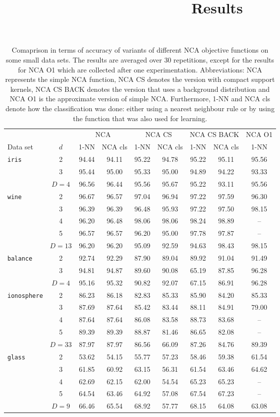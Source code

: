 \documentclass[a4paper,10pt]{article}
\title{Results}
\author{}
\date{}
\begin{document}
\begin{table}[!h]
\centering\begin{tabular}{lcccccccc}
\toprule
	 &     & \multicolumn{2}{c}{NCA}  & \multicolumn{2}{c}{NCA CS} & \multicolumn{2}{c}{NCA CS BACK} & NCA O1 \\
\cmidrule(r){3-4} \cmidrule(r){5-6} \cmidrule(r){7-8} \cmidrule(r){9-9}
Data set & $d$ & 1-NN & NCA cls & 1-NN & NCA cls & 1-NN & NCA cls & 1-NN\\
\midrule
\texttt{iris}	&2&94.44&94.11&95.22&94.78&95.22&95.11&95.56\\
				&3	&95.44&95.00&95.33&95.00&94.89&94.22&93.33\\
				&$D=4$	&96.56&96.44&95.56&95.67&95.22&93.11&95.56\\
\midrule
\texttt{wine}	&2
				&96.67&96.57&97.04&96.94&97.22&97.59&96.30\\
			&3	&96.39&96.39&96.48&95.93&97.22&97.50&98.15\\
			&4	&96.20&96.48&98.06&98.06&98.24&98.89&--\\
			&5	&96.57&96.57&96.20&95.00&97.78&97.87&--\\
			&$D=13$	&96.20&96.20&95.09&92.59&94.63&98.43&98.15\\

\midrule
\texttt{balance}&2&92.74&92.29&87.90&89.04&89.92&91.04&91.49\\
				&3&94.81&94.87&89.60&90.08&65.19&87.85&96.28\\
				&$D=4$&95.16&95.32&90.82&92.07&67.15&86.91&96.28\\
\midrule
\texttt{ionosphere} &2&86.23&86.18&82.83&85.33&85.90&84.20&85.33\\
					&3&87.69&87.64&85.42&83.44&88.11&84.91&79.00\\
					&4&87.64&87.64&86.08&83.58&88.73&83.68&--\\
					&5&89.39&89.39&88.87&81.46&86.65&82.08&--\\
					&$D=33$&87.97&87.97&86.56&66.09&87.26&84.76&89.39\\
\midrule
\texttt{glass} 	  &2&53.62&54.15&55.77&57.23&58.46&59.38&61.54\\
				&3	&61.85&60.92&63.15&56.31&61.54&63.46&64.62\\
				&4	&62.69&62.15&62.00&54.54&65.23&65.23&--\\
				&5	&64.54&63.46&64.92&57.08&67.54&67.23&--\\
				&$D=9$	&66.46&65.54&68.92&57.77&68.15&64.08&63.08\\
\bottomrule
\end{tabular}
\caption{Comaprison in terms of accuracy of variants of different NCA objective functions on some small data sets. The results are averaged over 30 repetitions, except for the results for NCA O1 which are collected after one experimentation. Abbreviations: NCA represents the simple NCA function, NCA CS denotes the version with compact support kernels, NCA CS BACK denotes the version that uses a background distribution and NCA O1 is the approximate version of simple NCA. Furthermore, 1-NN and NCA cls denote how the classification was done: either using a nearest neighbour rule or by using the function that was also used for learning.}
\end{table}
\end{document}

